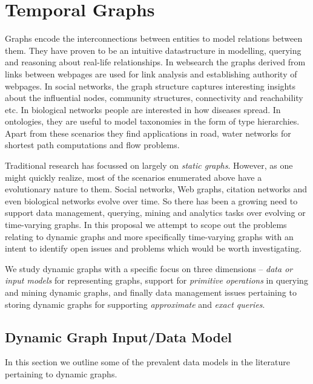 \section{Temporal Graphs}
\label{sec:temporal-graphs}

Graphs encode the interconnections between entities to model relations between them. They have proven to be an intuitive datastructure in modelling, querying and reasoning about real-life relationships. In websearch the graphs derived from links between webpages are used for link analysis and establishing authority of webpages. In social networks, the graph structure captures interesting insights about the influential nodes, community structures, connectivity and reachability etc. In biological networks people are interested in how diseases spread. In ontologies, they are useful to model taxonomies in the form of type hierarchies. Apart from these scenarios they find applications in road, water networks for shortest path computations and flow problems. 

Traditional research has focussed on largely on \emph{static graphs}. However, as one might quickly realize, most of the scenarios enumerated above have a evolutionary nature to them. Social networks, Web graphs, citation networks and even biological networks evolve over time. So there has been a growing need to support data management, querying, mining and analytics tasks over evolving or time-varying graphs. In this proposal we attempt to scope out the problems relating to dynamic graphs and more specifically time-varying graphs with an intent to identify open issues and problems which would be worth investigating.

We study dynamic graphs with a specific focus on three dimensions -- \emph{data or input models} for representing graphs, support for \emph{primitive operations} in querying and mining dynamic graphs, and finally data management issues pertaining to storing dynamic graphs for supporting \emph{approximate} and \emph{exact queries}.

\subsection{Dynamic Graph Input/Data Model}
\label{sec: data-model}

In this section we outline some of the prevalent data models in the literature pertaining to dynamic graphs. 

